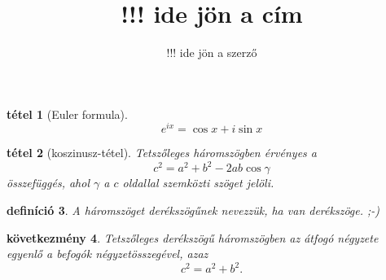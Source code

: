 \documentclass{article}
\title{!!! ide jön a cím}
\author{!!! ide jön a szerző}
\theoremstyle{hu-plain}
\newtheorem{tetel}{tétel}
\newtheorem{kovet}[tetel]{következmény}
\newtheorem{defi}[tetel]{definíció}
\theoremstyle{redthm}
\newtheorem{csicsastetel}[tetel]{tétel}
\begin{document}
\begin{csicsastetel}[Euler formula]
\[
e^{ix} = \cos x + i \sin x
\]
\end{csicsastetel}

\theoremstyle{hu-plain}

\begin{tetel}[koszinusz-tétel]
Tetszőleges háromszögben érvényes a
\begin{equation}
c^2 = a^2 + b^2 -2ab\cos \gamma
\end{equation}
összefüggés, ahol $\gamma$ a $c$ oldallal szemközti szöget jelöli.
\end{tetel}

\begin{defi}
A háromszöget derékszögűnek nevezzük, ha van derékszöge. ;-)
\end{defi}
\begin{kovet}
Tetszőleges derékszögű háromszögben az átfogó négyzete egyenlő
a befogók négyzetösszegével, azaz
\begin{equation}
c^2 = a^2 + b^2\text{.}
\end{equation}
\end{kovet}
\end{document}
